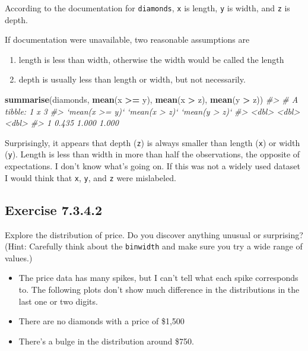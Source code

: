 \documentclass[]{book}
\newenvironment{Shaded}{\begin{snugshade}}{\end{snugshade}}
\newcommand{\CommentTok}[1]{\textcolor[rgb]{0.56,0.35,0.01}{\textit{#1}}}
\newcommand{\KeywordTok}[1]{\textcolor[rgb]{0.13,0.29,0.53}{\textbf{#1}}}
\newcommand{\NormalTok}[1]{#1}
\newcommand{\OperatorTok}[1]{\textcolor[rgb]{0.81,0.36,0.00}{\textbf{#1}}}
\newcommand{\StringTok}[1]{\textcolor[rgb]{0.31,0.60,0.02}{#1}}
\providecommand{\tightlist}{%
  \setlength{\itemsep}{0pt}\setlength{\parskip}{0pt}}
\theoremstyle{plain}
\theoremstyle{remark}
\begin{document}
According to the documentation for \texttt{diamonds}, \texttt{x} is
length, \texttt{y} is width, and \texttt{z} is depth.

If documentation were unavailable, two reasonable assumptions are

\begin{enumerate}
\def\labelenumi{\arabic{enumi}.}
\tightlist
\item
  length is less than width, otherwise the width would be called the
  length
\item
  depth is usually less than length or width, but not necessarily.
\end{enumerate}

\begin{Shaded}
\begin{Highlighting}[]
\KeywordTok{summarise}\NormalTok{(diamonds, }\KeywordTok{mean}\NormalTok{(x }\OperatorTok{>=}\StringTok{ }\NormalTok{y), }\KeywordTok{mean}\NormalTok{(x }\OperatorTok{>}\StringTok{ }\NormalTok{z), }\KeywordTok{mean}\NormalTok{(y }\OperatorTok{>}\StringTok{ }\NormalTok{z))}
\CommentTok{#> # A tibble: 1 x 3}
\CommentTok{#>   `mean(x >= y)` `mean(x > z)` `mean(y > z)`}
\CommentTok{#>            <dbl>         <dbl>         <dbl>}
\CommentTok{#> 1          0.435         1.000         1.000}
\end{Highlighting}
\end{Shaded}

Surprisingly, it appears that depth (\texttt{z}) is always smaller than
length (\texttt{x}) or width (\texttt{y}). Length is less than width in
more than half the observations, the opposite of expectations. I don't
know what's going on. If this was not a widely used dataset I would
think that \texttt{x}, \texttt{y}, and \texttt{z} were mislabeled.

\hypertarget{exercise-7.3.4.2}{%
\subsection*{\texorpdfstring{Exercise
{7.3.4.2}}{Exercise 7.3.4.2}}\label{exercise-7.3.4.2}}

Explore the distribution of price. Do you discover anything unusual or
surprising? (Hint: Carefully think about the \texttt{binwidth} and make
sure you try a wide range of values.)

\begin{itemize}
\tightlist
\item
  The price data has many spikes, but I can't tell what each spike
  corresponds to. The following plots don't show much difference in the
  distributions in the last one or two digits.
\item
  There are no diamonds with a price of \$1,500
\item
  There's a bulge in the distribution around \$750.
\end{itemize}
\end{document}

